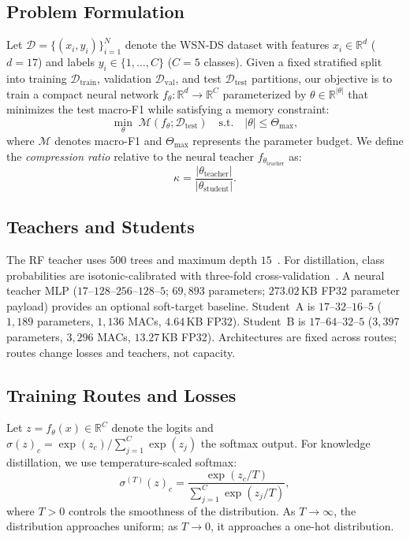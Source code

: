 \documentclass[journal]{IEEEtran}
\begin{document}
\subsection{Problem Formulation}
\label{sec:problem}
Let $\mathcal{D} = \{(x_i, y_i)\}_{i=1}^{N}$ denote the WSN-DS dataset with features $x_i \in \mathbb{R}^{d}$ ($d=17$) and labels $y_i \in \{1, \ldots, C\}$ ($C=5$ classes).
Given a fixed stratified split into training $\mathcal{D}_{\mathrm{train}}$, validation $\mathcal{D}_{\mathrm{val}}$, and test $\mathcal{D}_{\mathrm{test}}$ partitions, our objective is to train a compact neural network $f_\theta: \mathbb{R}^{d} \rightarrow \mathbb{R}^{C}$ parameterized by $\theta \in \mathbb{R}^{|\theta|}$ that minimizes the test macro-F1 while satisfying a memory constraint:
\begin{equation}
\min_\theta \; \mathcal{M}(f_\theta; \mathcal{D}_{\mathrm{test}}) \quad \text{s.t.} \quad |\theta| \leq \Theta_{\max},
\end{equation}
where $\mathcal{M}$ denotes macro-F1 and $\Theta_{\max}$ represents the parameter budget.
We define the \emph{compression ratio} relative to the neural teacher $f_{\theta_{\mathrm{teacher}}}$ as:
\begin{equation}
\kappa = \frac{|\theta_{\mathrm{teacher}}|}{|\theta_{\mathrm{student}}|}.
\end{equation}

\subsection{Teachers and Students}
\label{sec:architectures}
The RF teacher uses $500$ trees and maximum depth $15$~\cite{breiman2001random}.
For distillation, class probabilities are isotonic-calibrated with three-fold cross-validation~\cite{guo2017calibration}.
A neural teacher MLP ($17$--$128$--$256$--$128$--$5$; $69{,}893$ parameters; $273.02$\,KB FP32 parameter payload) provides an optional soft-target baseline.
Student~A is $17$--$32$--$16$--$5$ ($1{,}189$ parameters, $1{,}136$ MACs, $4.64$\,KB FP32).
Student~B is $17$--$64$--$32$--$5$ ($3{,}397$ parameters, $3{,}296$ MACs, $13.27$\,KB FP32).
Architectures are fixed across routes; routes change losses and teachers, not capacity.

\subsection{Training Routes and Losses}
\label{sec:routes}
Let $z = f_\theta(x) \in \mathbb{R}^{C}$ denote the logits and $\sigma(z)_c = \exp(z_c) / \sum_{j=1}^{C} \exp(z_j)$ the softmax output.
For knowledge distillation, we use temperature-scaled softmax:
\begin{equation}
\sigma^{(T)}(z)_c = \frac{\exp(z_c / T)}{\sum_{j=1}^{C} \exp(z_j / T)},
\end{equation}
where $T > 0$ controls the smoothness of the distribution.
As $T \rightarrow \infty$, the distribution approaches uniform; as $T \rightarrow 0$, it approaches a one-hot distribution.
\end{document}
